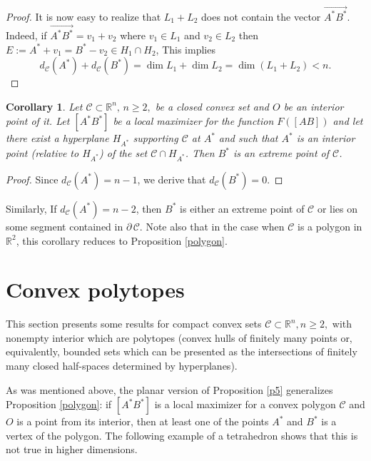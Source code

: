 \documentclass[a4paper,12pt]{amsart}
\newtheorem{cor}[thm]{Corollary}
\begin{document}
\begin{proof}
It is now easy to realize that $L_1 + L_2$ does not contain the vector $\overrightarrow{A^*B^*}$. Indeed, if
$\overrightarrow{A^*B^*}= v_1 + v_2$
where $v_1 \in L_1$ and $v_2 \in L_2$ then $E:=A^* +v_1=B^* - v_2 \in H_1 \cap H_2$, This implies
$$d_{\mathcal C}(A^*) + d_{\mathcal C}(B^*) = \dim L_1 + \dim L_2 = \dim(L_1 + L_2) < n.$$
\end{proof}

\begin{cor}
Let  $\mathcal C \subset \mathbb{R}^n,\, n \geq 2,$ be a closed convex set
and $O$ be an interior point of it.
Let $[A^*B^*]$ be a local maximizer for the function $F([AB])$ and let there exist a hyperplane $H_{A^*}$ supporting
$\mathcal C$ at $A^*$ and such that $A^*$ is an interior point
(relative to $H_{A^*}$) of the set
$\mathcal C \cap H_{A^*}$.
Then $B^*$ is an extreme point of $\mathcal C$.
 \end{cor}
 \begin{proof}
 Since $d_{\mathcal C}(A^*)= n-1$, we derive that $d_{\mathcal C}(B^*)=0$.
 \end{proof}

 Similarly, If $d_{\mathcal C}(A^*) = n-2$, then $B^*$ is either an extreme point
 of $\mathcal C$ or lies on some segment contained in $\partial \, \mathcal C$.
 Note also that in the case when $\mathcal C$ is a polygon in $\mathbb R^2$, this corollary reduces to Proposition \ref{polygon}.

\section{Convex polytopes}\label{sc}

This section presents some results for compact convex sets $\mathcal C \subset \mathbb R^n, n\geq 2, $ with nonempty interior which are polytopes (convex hulls
of finitely many points or, equivalently, bounded sets which can be presented as the
 intersections of finitely many closed half-spaces determined by hyperplanes).
 \smallskip


As was mentioned above, the planar version of Proposition \ref{p5} generalizes Proposition
\ref{polygon}: if $[A^*B^*]$ is a local maximizer for a convex polygon $\mathcal C$
and $O$ is a point from its interior, then at least one of the points $A^*$ and $B^*$ is a vertex of the polygon.
The following example of a tetrahedron shows that this is not true in higher dimensions.
\end{document}
